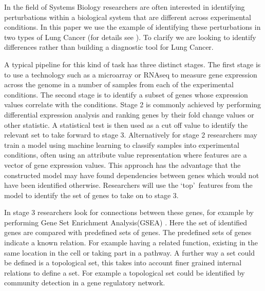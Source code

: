 \documentclass[runningheads,a4paper]{llncs}
\begin{document}
In the field of Systems Biology researchers are often interested in identifying perturbations within a biological system that are different across experimental conditions. In this paper we use the example of identifying these perturbations in two types of Lung Cancer (for details  see \citep{rhrissorrakrai_sbv_2013}).
To clarify we are looking to identify differences rather than building a diagnostic tool for Lung Cancer.

A typical pipeline for this kind of task has three distinct stages. The first stage is to use a technology such as a microarray or RNAseq to measure gene expression across the genome in a number of samples from each of the experimental conditions. 
The second stage is to identify a subset of genes whose expression values correlate with the conditions.
Stage 2 is commonly achieved by performing differential expression analysis and ranking genes by their fold change values or other statistic. A statistical test is then used as a cut off value to identify the relevant set to take forward to stage 3. 
Alternatively for stage 2 researchers may train a model using machine learning to classify samples into experimental conditions, often using an attribute value representation where features are a vector of gene expression values. 
This approach has the advantage that the constructed model may have found dependencies between genes which would not have been identified otherwise.
Researchers will use the \lq top\rq\ features from the model to identify the set of genes to take on to stage 3. 


In stage 3  researchers look for connections between these genes, for example by performing Gene Set Enrichment Analysis(GSEA) \citep{subramanian_gene_2005}. Here the set of identified genes are compared with predefined sets of genes. The predefined sets of genes indicate a known relation. For example having a related function, existing in the same location in the cell or taking part in a pathway. A further way a set could be defined is a topological set, this takes into account finer grained internal relations to define a set. For example a topological set could be identified by community detection in a gene regulatory network.
\end{document}
